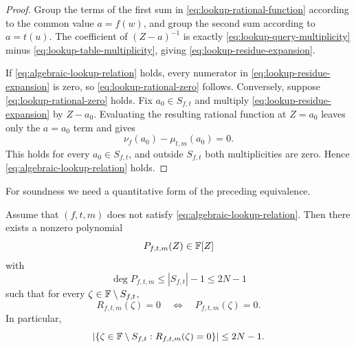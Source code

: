 \begin{proof}
Group the terms of the first sum in \eqref{eq:lookup-rational-function} according to the common value $a=f(w)$, and group the second sum according to $a=t(u)$.  The coefficient of $(Z-a)^{-1}$ is exactly \eqref{eq:lookup-query-multiplicity} minus \eqref{eq:lookup-table-multiplicity}, giving \eqref{eq:lookup-residue-expansion}.

If \eqref{eq:algebraic-lookup-relation} holds, every numerator in \eqref{eq:lookup-residue-expansion} is zero, so \eqref{eq:lookup-rational-zero} follows.  Conversely, suppose \eqref{eq:lookup-rational-zero} holds.  Fix $a_0\in S_{f,t}$ and multiply \eqref{eq:lookup-residue-expansion} by $Z-a_0$.  Evaluating the resulting rational function at $Z=a_0$ leaves only the $a=a_0$ term and gives
\[
  \nu_f(a_0)-\mu_{t,m}(a_0)=0.
\]
This holds for every $a_0\in S_{f,t}$, and outside $S_{f,t}$ both multiplicities are zero.  Hence \eqref{eq:algebraic-lookup-relation} holds.
\end{proof}

For soundness we need a quantitative form of the preceding equivalence.

\begin{lemma}
\label{lem:lookup-bad-challenges}
Assume that $(f,t,m)$ does not satisfy \eqref{eq:algebraic-lookup-relation}.  Then there exists a nonzero polynomial
\begin{equation}
  P_{f,t,m}(Z)\in\mathbb{F}[Z]
  \label{eq:lookup-numerator-polynomial}
\end{equation}
with
\begin{equation}
  \deg P_{f,t,m}\le |S_{f,t}|-1\le2N-1
  \label{eq:lookup-numerator-degree}
\end{equation}
such that for every $\zeta\in\mathbb{F}\setminus S_{f,t}$,
\begin{equation}
  R_{f,t,m}(\zeta)=0
  \quad\Longleftrightarrow\quad
  P_{f,t,m}(\zeta)=0.
  \label{eq:lookup-root-equivalence}
\end{equation}
In particular,
\begin{equation}
  \left|
    \left\{
      \zeta\in\mathbb{F}\setminus S_{f,t}:
      R_{f,t,m}(\zeta)=0
    \right\}
  \right|
  \le2N-1.
  \label{eq:lookup-bad-shift-count}
\end{equation}
\end{lemma}

